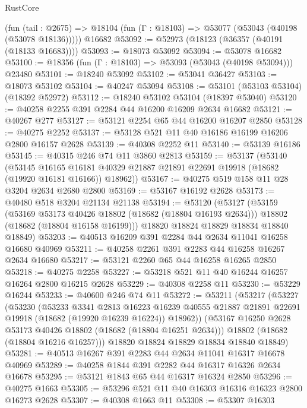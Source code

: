 \begin{lexlean}{RustCore}
\begin{coremodule}
    (fun (tail : @2675) => @18104 (fun (Γ : @18103) => @53077 (@53043 (@40198 (@53078 @18136)))))
    @16682
@53092 := @52973 (@18123 (@36357 (@40191 (@18133 @16683))))
@53093 := @18073 @53092
@53094 := @53078 @16682
@53100 := @18356 (fun (Γ : @18103) => @53093 (@53043 (@40198 @53094))) @23480
@53101 := @18240 @53092
@53102 := @53041 @36427
@53103 := @18073 @53102
@53104 := @40247 @53094
@53108 := @53101 (@53103 @53104) (@18392 @52972)
@53112 := @18240 @53102 @53104 (@18397 @53040)
@53120 := @40258 @2255 @391 @2284 @44 @16200 @16209 @2634 @16682
@53121 := @40267 @277
@53127 := @53121 @2254 @65 @44 @16200 @16207 @2850
@53128 := @40275 @2252
@53137 := @53128 @521 @11 @40 @16186 @16199 @16206 @2800 @16157 @2628
@53139 := @40308 @2252 @11
@53140 := @53139 @16186
@53145 := @40315 @246 @74 @11 @3860 @2813
@53159 := @53137
    (@53140
      (@53145
        @16165
        @16181
        @40329
        @21887
        @21891
        @22691
        @19918
        (@18682 (@19920 @16181 @16166))
        @18962))
@53167 := @40275 @519 @158 @11 @28 @3204 @2634 @2680 @2800
@53169 := @53167 @16192 @2628
@53173 := @40480 @518 @3204 @21134 @21138
@53194 := @53120
    (@53127
      (@53159
        (@53169 @53173 @40426 @18802 (@18682 (@18804 @16193 @2634)))
        @18802
        (@18682 (@18804 @16158 @16199)))
      @18820
      @18824
      @18829
      @18834
      @18840
      @18849)
@53203 := @40513 @16209 @391 @2284 @44 @2634 @11041 @16258 @16680 @40969
@53211 := @40258 @2261 @391 @2283 @44 @16258 @16267 @2634 @16680
@53217 := @53121 @2260 @65 @44 @16258 @16265 @2850
@53218 := @40275 @2258
@53227 := @53218 @521 @11 @40 @16244 @16257 @16264 @2800 @16215 @2628
@53229 := @40308 @2258 @11
@53230 := @53229 @16244
@53233 := @40600 @246 @74 @11
@53272 := @53211
    (@53217
      (@53227
        (@53230
          (@53233
            @3341
            @2813
            @16223
            @16239
            @40555
            @21887
            @21891
            @22691
            @19918
            (@18682 (@19920 @16239 @16224))
            @18962))
        (@53167 @16250 @2628 @53173 @40426 @18802 (@18682 (@18804 @16251 @2634)))
        @18802
        (@18682 (@18804 @16216 @16257)))
      @18820
      @18824
      @18829
      @18834
      @18840
      @18849)
@53281 := @40513 @16267 @391 @2283 @44 @2634 @11041 @16317 @16678 @40969
@53289 := @40258 @1844 @391 @2282 @44 @16317 @16326 @2634 @16678
@53295 := @53121 @1843 @65 @44 @16317 @16324 @2850
@53296 := @40275 @1663
@53305 := @53296 @521 @11 @40 @16303 @16316 @16323 @2800 @16273 @2628
@53307 := @40308 @1663 @11
@53308 := @53307 @16303

\end{coremodule}
\end{lexlean}
